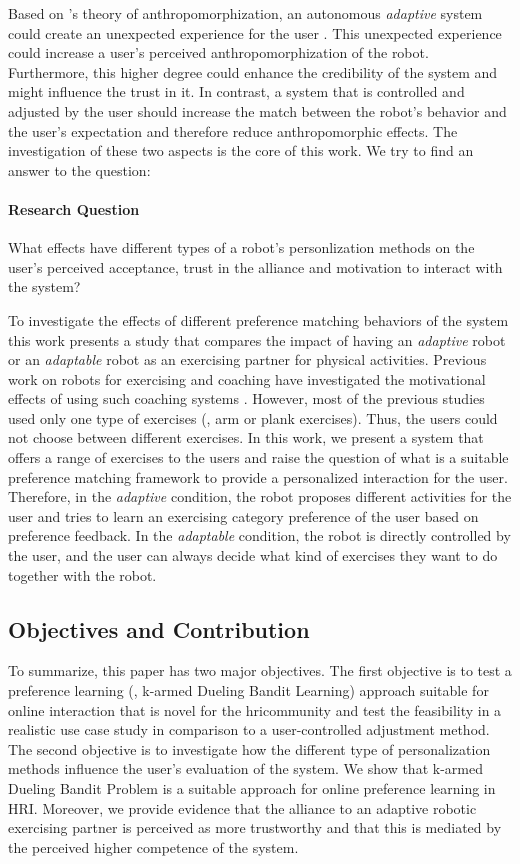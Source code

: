 \documentclass[twocolumn]{svjour3}          %
\begin{document}
Based on \citeauthor{epley2007seeing}'s theory of anthropomorphization, an autonomous \textit{adaptive} system could create an unexpected experience for the user \autocite{epley2007seeing}. This unexpected experience could increase a user's perceived anthropomorphization of the robot. Furthermore, this higher degree could enhance the credibility of the system and might influence the trust in it. In contrast, a system that is controlled and adjusted by the user should increase the match between the robot's behavior and the user's expectation and therefore reduce anthropomorphic effects. The investigation of these two aspects is the core of this work. We try to find an answer to the question:

\paragraph{Research Question}
What effects have different types of a robot's personlization methods on the
user's perceived acceptance, trust in the alliance and motivation to interact with the
system?

To investigate the effects of different preference matching behaviors of
the system this work presents a study that compares the impact of having
an \textit{adaptive} robot or an \textit{adaptable} robot as an exercising partner for
physical activities. Previous work on robots for exercising and coaching
have investigated the motivational effects of using such coaching
systems \autocite{fasola2013socially,schneider2016exercising,guneysu2017}.
However, most of the previous studies used only one type of exercises (\eg{}, arm or plank exercises). Thus, the users could not choose between different exercises. In this work, we present a system that offers a range of exercises to the users and raise the question of what
is a suitable preference matching framework to provide a personalized interaction for the user. Therefore, in the \textit{adaptive} condition, the robot proposes different activities for the user and tries to learn an exercising category preference of the user based on preference feedback. In the \textit{adaptable} condition, the robot is directly controlled by the
user, and the user can always decide what kind of exercises they want to
do together with the robot.

\subsection{Objectives and Contribution}
To summarize, this paper has two major objectives. The first objective is to test a preference learning (\ie{}, k-armed Dueling Bandit Learning) approach suitable for online interaction that is novel for the \gls{hri}community and test the feasibility in a realistic use case study in comparison to a user-controlled adjustment method. The second objective is to investigate how the different type of personalization methods influence the user's evaluation of the system. We show that k-armed Dueling Bandit Problem is a suitable approach for online preference learning in HRI. Moreover, we provide evidence that the alliance to an adaptive robotic exercising partner is perceived as more trustworthy and that this is mediated by the perceived higher competence of the system.
\end{document}
